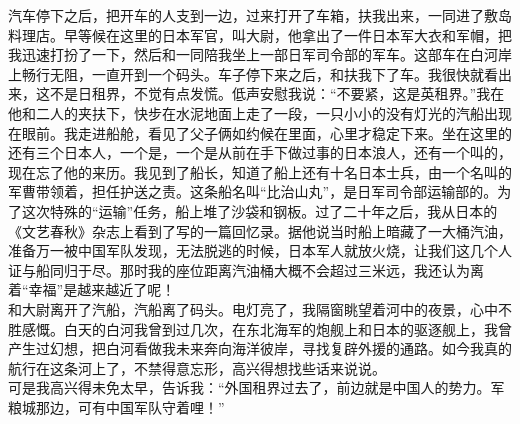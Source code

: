 汽车停下之后，把开车的人支到一边，过来打开了车箱，扶我出来，一同进了敷岛料理店。早等候在这里的日本军官，叫大尉，他拿出了一件日本军大衣和军帽，把我迅速打扮了一下，然后和一同陪我坐上一部日军司令部的军车。这部车在白河岸上畅行无阻，一直开到一个码头。车子停下来之后，和扶我下了车。我很快就看出来，这不是日租界，不觉有点发慌。低声安慰我说：“不要紧，这是英租界。”我在他和二人的夹扶下，快步在水泥地面上走了一段，一只小小的没有灯光的汽船出现在眼前。我走进船舱，看见了父子俩如约候在里面，心里才稳定下来。坐在这里的还有三个日本人，一个是，一个是从前在手下做过事的日本浪人，还有一个叫的，现在忘了他的来历。我见到了船长，知道了船上还有十名日本士兵，由一个名叫的军曹带领着，担任护送之责。这条船名叫“比治山丸”，是日军司令部运输部的。为了这次特殊的“运输”任务，船上堆了沙袋和钢板。过了二十年之后，我从日本的《文艺春秋》杂志上看到了写的一篇回忆录。据他说当时船上暗藏了一大桶汽油，准备万一被中国军队发现，无法脱逃的时候，日本军人就放火烧，让我们这几个人证与船同归于尽。那时我的座位距离汽油桶大概不会超过三米远，我还认为离着“幸福”是越来越近了呢！\\

和大尉离开了汽船，汽船离了码头。电灯亮了，我隔窗眺望着河中的夜景，心中不胜感慨。白天的白河我曾到过几次，在东北海军的炮舰上和日本的驱逐舰上，我曾产生过幻想，把白河看做我未来奔向海洋彼岸，寻找复辟外援的通路。如今我真的航行在这条河上了，不禁得意忘形，高兴得想找些话来说说。\\

可是我高兴得未免太早，告诉我：“外国租界过去了，前边就是中国人的势力。军粮城那边，可有中国军队守着哩！”\\

